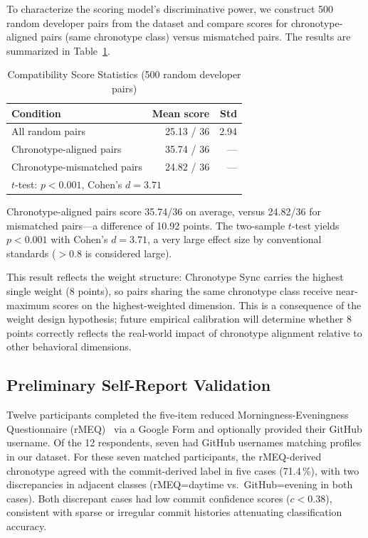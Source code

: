 \documentclass[conference]{IEEEtran}
\begin{document}
To characterize the scoring model's discriminative power, we
construct 500 random developer pairs from the dataset and compare
scores for chronotype-aligned pairs (same chronotype class) versus
mismatched pairs.  The results are summarized in
Table~\ref{tab:compat}.

\begin{table}[t]
\caption{Compatibility Score Statistics (500 random developer pairs)}
\label{tab:compat}
\centering
\small
\begin{tabular}{lrr}
\toprule
Condition & Mean score & Std \\
\midrule
All random pairs          & 25.13 / 36 & 2.94 \\
Chronotype-aligned pairs  & 35.74 / 36 & — \\
Chronotype-mismatched pairs & 24.82 / 36 & — \\
\midrule
\multicolumn{3}{l}{$t$-test: $p < 0.001$, Cohen's $d = 3.71$} \\
\bottomrule
\end{tabular}
\end{table}

Chronotype-aligned pairs score 35.74/36 on average, versus
24.82/36 for mismatched pairs---a difference of 10.92 points.
The two-sample $t$-test yields $p < 0.001$ with Cohen's
$d = 3.71$, a very large effect size by conventional standards
(${>}0.8$ is considered large).

This result reflects the weight structure: Chronotype Sync carries
the highest single weight (8 points), so pairs sharing the same
chronotype class receive near-maximum scores on the highest-weighted
dimension.  This is a consequence of the weight design hypothesis;
future empirical calibration will determine whether 8 points
correctly reflects the real-world impact of chronotype alignment
relative to other behavioral dimensions.

\subsection{Preliminary Self-Report Validation}

Twelve participants completed the five-item reduced
Morningness-Eveningness Questionnaire (rMEQ)~\cite{adan1991} via
a Google Form and optionally provided their GitHub username.
Of the 12 respondents, seven had GitHub usernames matching profiles
in our dataset.  For these seven matched participants, the
rMEQ-derived chronotype agreed with the commit-derived label in
five cases (71.4\,\%), with two discrepancies in adjacent classes
(rMEQ=daytime vs.\ GitHub=evening in both cases).  Both discrepant
cases had low commit confidence scores ($c < 0.38$), consistent
with sparse or irregular commit histories attenuating classification
accuracy.
\end{document}
